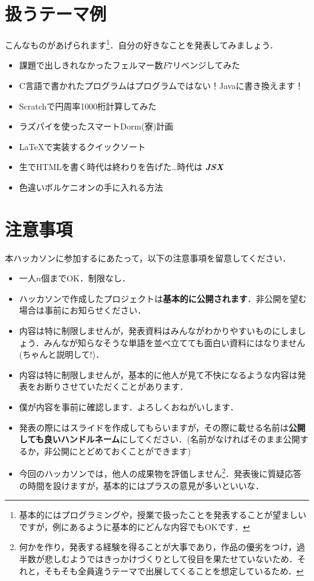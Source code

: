 \documentclass[a4j]{jarticle}
\begin{document}
\section{扱うテーマ例}
こんなものがあげられます\footnote{基本的にはプログラミングや，授業で扱ったことを発表することが望ましいですが，例にあるように基本的にどんな内容でもOKです．}．自分の好きなことを発表してみましょう．
\begin{itemize}
    \item 課題で出しきれなかったフェルマー数$F7$リベンジしてみた
    \item C言語で書かれたプログラムはプログラムではない！Javaに書き換えます！
    \item Scratchで円周率1000桁計算してみた
    \item ラズパイを使ったスマートDorm(寮)計画
    \item \LaTeX で実装するクイックソート
    \item 生でHTMLを書く時代は終わりを告げた\dots 時代は \textit{\textbf{\textdagger JSX\textdagger}}
    \item 色違いボルケニオンの手に入れる方法
\end{itemize}

\section{注意事項}
本ハッカソンに参加するにあたって，以下の注意事項を留意してください．
\begin{itemize}
    \item 一人$n$個までOK．制限なし．
    \item ハッカソンで作成したプロジェクトは\textbf{基本的に公開されます}．非公開を望む場合は事前にお知らせください．
    \item 内容は特に制限しませんが，発表資料はみんながわかりやすいものにしましょう．みんなが知らなそうな単語を並べ立てても面白い資料にはなりません(ちゃんと説明して!)．
    \item 内容は特に制限しませんが，基本的に他人が見て不快になるような内容は発表をお断りさせていただくことがあります．
    \item 僕が内容を事前に確認します．よろしくおねがいします．
    \item 発表の際にはスライドを作成してもらいますが，その際に載せる名前は\textbf{公開しても良いハンドルネーム}にしてください．(名前がなければそのまま公開するか，非公開にとどめておくことができます)
    \item 今回のハッカソンでは，他人の成果物を評価しません\footnote{何かを作り，発表する経験を得ることが大事であり，作品の優劣をつけ，過半数が悲しむようではきっかけづくりとして役目を果たせていないため．それと，そもそも全員違うテーマで出展してくることを想定しているため．}．発表後に質疑応答の時間を設けますが，基本的にはプラスの意見が多いといいな．
\end{itemize}
\end{document}

